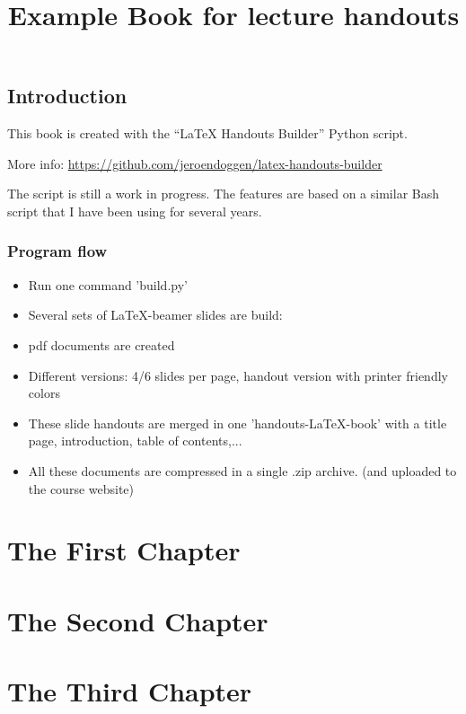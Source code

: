 \documentclass{book}
\title{Example Book for lecture  handouts}
\begin{document}
\maketitle
\tableofcontents

\chapter*{Introduction}
\label{chap_intro}

This book is created with the ``LaTeX Handouts Builder'' Python script.

\noindent More info: \url{https://github.com/jeroendoggen/latex-handouts-builder}

\noindent The script is still a work in progress. The features are based on a similar Bash script that I have been using for several years.

\section*{Program flow}

\begin{itemize}
\item Run one command 'build.py'
\item Several sets of LaTeX-beamer slides are build:
\item pdf documents are created
\item Different versions: 4/6 slides per page, handout version with printer friendly colors
\item These slide handouts are merged in one 'handouts-LaTeX-book' with a title page, introduction, table of contents,...
\item All these documents are compressed in a single .zip archive. (and uploaded to the course website)
\end{itemize}


\part{The First Chapter}


\part{The Second Chapter}


\part{The Third Chapter}

\end{document}
